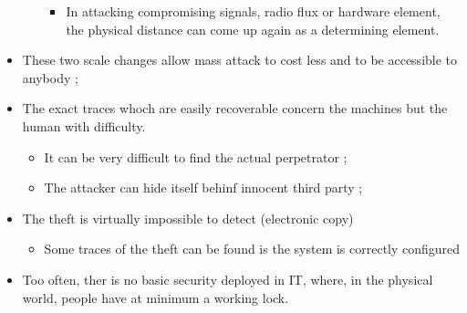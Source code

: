 \documentclass[11pt]{article} %
\begin{document}
\begin{itemize}
\begin{itemize}
\begin{itemize}
\item In attacking compromising signals, radio flux or hardware element, 
the physical distance can come up again as a determining element.
		\end{itemize}
	\end{itemize}
\item These two scale changes allow mass attack to cost less and to be 
accessible to anybody ;
\item The exact traces whoch are easily recoverable concern the machines but the human with difficulty. 
	\begin{itemize}
	\item It can be very difficult to find the actual perpetrator ;
	\item The attacker can hide itself behinf innocent third party ;
	\end{itemize}
\item The theft is virtually impossible to detect (electronic copy)
	\begin{itemize}
\item Some traces of the theft can be found is the system is correctly configured
	\end{itemize}
\item Too often, ther is no basic security deployed in IT, where, in the physical world, 
people have at minimum a working lock.
\end{itemize}

\newpage
\end{document}
